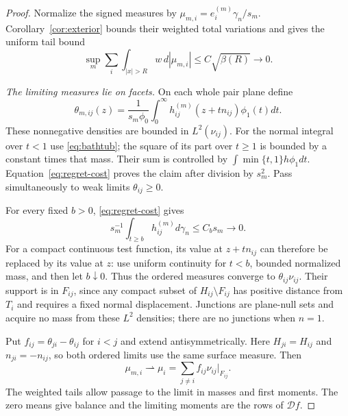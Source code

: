 \documentclass[11pt,reqno]{amsart}
\newcommand{\ga}{\gamma}
\newcommand{\DD}{\mathcal D}
\begin{document}
\begin{proof}
Normalize the signed measures by $\mu_{m,i}=e_i^{(m)}\ga_n/s_m$.
Corollary~\ref{cor:exterior} bounds their weighted total variations and
gives the uniform tail bound
\begin{equation}\label{eq:normalized-tightness}
 \sup_m\sum_i\int_{|x|>R}w\,d|\mu_{m,i}|
       \le C\sqrt{\beta(R)}\longrightarrow0.
\end{equation}

\smallskip\noindent\emph{The limiting measures lie on facets.}
On each whole pair plane define
\begin{equation}\label{eq:theta}
 \theta_{m,ij}(z)=\frac1{s_m\phi_0}
                  \int_0^\infty h_{ij}^{(m)}(z+tn_{ij})\phi_1(t)dt.
\end{equation}
These nonnegative densities are bounded in $L^2(\nu_{ij})$.
For the normal integral over $t<1$ use \eqref{eq:bathtub}; the square
of its part over $t\ge1$ is bounded by a constant times that mass.
Their sum is controlled by $\int\min\{t,1\}h\phi_1dt$.
Equation~\eqref{eq:regret-cost} proves the claim after division by
$s_m^2$. Pass simultaneously to weak limits $\theta_{ij}\ge0$.

For every fixed $b>0$, \eqref{eq:regret-cost} gives
\begin{equation}\label{eq:far-normal}
 s_m^{-1}\int_{t\ge b}h_{ij}^{(m)}d\ga_n\le C_bs_m\to0.
\end{equation}
For a compact continuous test function, its value at $z+tn_{ij}$ can
therefore be replaced by its value at $z$: use uniform continuity for
$t<b$, bounded normalized mass, and then let $b\downarrow0$.
Thus the ordered measures converge to $\theta_{ij}\nu_{ij}$.
Their support is in $F_{ij}$, since any compact subset of
$H_{ij}\setminus F_{ij}$ has positive distance from $T_i$ and requires
a fixed normal displacement. Junctions are plane-null sets and acquire
no mass from these $L^2$ densities; there are no junctions when $n=1$.

Put $f_{ij}=\theta_{ji}-\theta_{ij}$ for $i<j$ and extend
antisymmetrically. Here $H_{ji}=H_{ij}$ and $n_{ji}=-n_{ij}$, so both
ordered limits use the same surface measure. Then
\begin{equation}\label{eq:measure-limit}
 \mu_{m,i}\rightharpoonup\mu_i
       =\sum_{j\ne i}f_{ij}\nu_{ij}|_{F_{ij}}.
\end{equation}
The weighted tails allow passage to the limit in masses and first moments.
The zero means give balance and the limiting moments are the rows of $\DD f$.


\end{proof}
\end{document}
